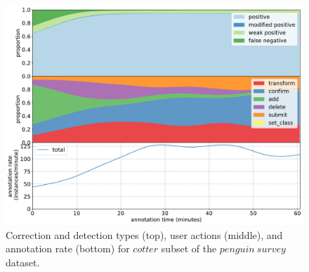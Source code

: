 \begin{figure}[!h]
\centering
\includegraphics[width=1.0\linewidth]{charts/aerial_penguins/action_annotations/cotter_a.pdf}
\caption{Correction and detection types (top), user actions (middle), and annotation rate (bottom) for $cotter$ subset of the $penguin\:survey$ dataset.}
\label{fig:cotter_annotation}
\end{figure}


